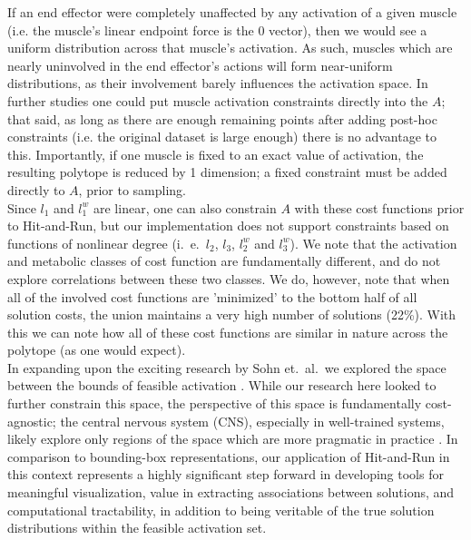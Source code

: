 If an end effector were completely unaffected by any activation of a given muscle (i.e. the muscle's linear endpoint force is the 0 vector), then we would see a uniform distribution across that muscle's activation. As such, muscles which are nearly uninvolved in the end effector's actions will form near-uniform distributions, as their involvement barely influences the activation space.
In further studies one could put muscle activation constraints directly into the $A$; that said, as long as there are enough remaining points after adding post-hoc constraints (i.e. the original dataset is large enough) there is no advantage to this.
Importantly, if one muscle is fixed to an exact value of activation, the resulting polytope is reduced by 1 dimension; a fixed constraint must be added directly to $A$, prior to sampling.\\
Since $l_1$ and $l_1^w$ are linear, one can also constrain $A$ with these cost functions prior to Hit-and-Run, but our implementation does not support constraints based on functions of nonlinear degree (i.\ e.\ $l_2$, $l_3$, $l_2^w$ and $l_3^w$).
We note that the activation and metabolic classes of cost function are fundamentally different, and do not explore correlations between these two classes.
We do, however, note that when all of the involved cost functions are 'minimized' to the bottom half of all solution costs, the union maintains a very high number of solutions (22\%).
With this we can note how all of these cost functions are similar in nature across the polytope (as one would expect).\\

In expanding upon the exciting research by Sohn et.\ al.\, we explored the space between the bounds of feasible activation \cite{sohn2013cat_bounding_box}.
While our research here looked to further constrain this space, the perspective of this space is fundamentally cost-agnostic; the central nervous system (CNS), especially in well-trained systems, likely explore only regions of the space which are more pragmatic in practice \cite{todorov2002optimal}.
In comparison to bounding-box representations, our application of Hit-and-Run in this context represents a highly significant step forward in developing tools for meaningful visualization, value in extracting associations between solutions, and computational tractability, in addition to being veritable of the true solution distributions within the feasible activation set.

